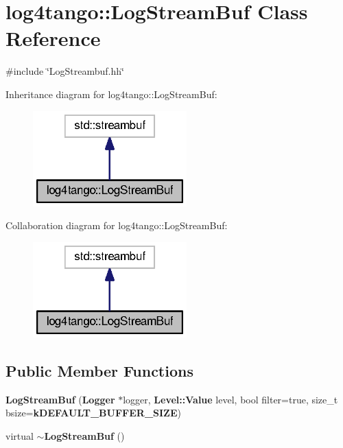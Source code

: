 \section{log4tango\-:\-:Log\-Stream\-Buf Class Reference}
\label{classlog4tango_1_1LogStreamBuf}


{\ttfamily \#include \char`\"{}Log\-Streambuf.\-hh\char`\"{}}



Inheritance diagram for log4tango\-:\-:Log\-Stream\-Buf\-:
\nopagebreak
\begin{figure}[H]
\begin{center}
\leavevmode
\includegraphics[width=168pt]{d4/d10/classlog4tango_1_1LogStreamBuf__inherit__graph}
\end{center}
\end{figure}


Collaboration diagram for log4tango\-:\-:Log\-Stream\-Buf\-:
\nopagebreak
\begin{figure}[H]
\begin{center}
\leavevmode
\includegraphics[width=168pt]{d3/db6/classlog4tango_1_1LogStreamBuf__coll__graph}
\end{center}
\end{figure}
\subsection*{Public Member Functions}
\begin{DoxyCompactItemize}
\item 
{\bf Log\-Stream\-Buf} ({\bf Logger} $\ast$logger, {\bf Level\-::\-Value} level, bool filter=true, size\-\_\-t bsize={\bf k\-D\-E\-F\-A\-U\-L\-T\-\_\-\-B\-U\-F\-F\-E\-R\-\_\-\-S\-I\-Z\-E})
\item 
virtual {\bf $\sim$\-Log\-Stream\-Buf} ()
\end{DoxyCompactItemize}
